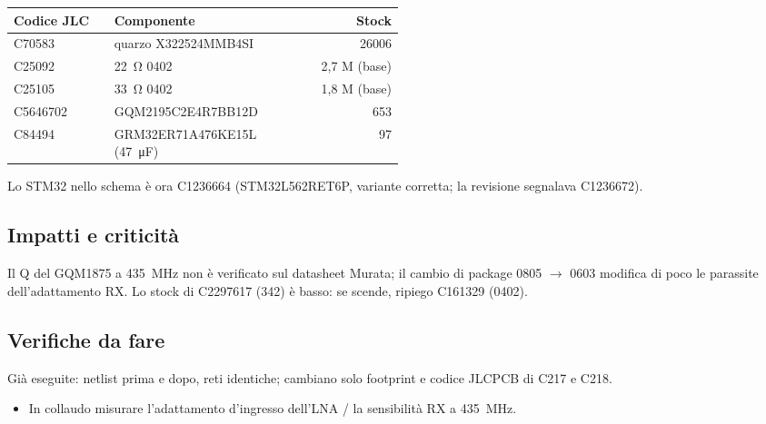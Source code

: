 {\small{}
\begin{tabular}{@{}lp{0.5\linewidth}r@{}}
\toprule
\textbf{Codice JLC} & \textbf{Componente} & \textbf{Stock}\\
\midrule
C70583 & quarzo X322524MMB4SI & 26006\\
C25092 & \SI{22}{\ohm} 0402 & 2,7 M (base)\\
C25105 & \SI{33}{\ohm} 0402 & 1,8 M (base)\\
C5646702 & GQM2195C2E4R7BB12D & 653\\
C84494 & GRM32ER71A476KE15L (\SI{47}{\micro\farad}) & 97\\
\bottomrule
\end{tabular}}

Lo STM32 nello schema è ora C1236664 (STM32L562RET6P, variante corretta; la revisione segnalava C1236672).

\subsection{Impatti e criticità}
\begin{notebox}
Il Q del GQM1875 a \SI{435}{\mega\hertz} non è verificato sul datasheet Murata; il cambio di package 0805 $\rightarrow$ 0603 modifica di poco le parassite dell'adattamento RX. Lo stock di C2297617 (342) è basso: se scende, ripiego C161329 (0402).
\end{notebox}

\subsection{Verifiche da fare}
Già eseguite: netlist prima e dopo, reti identiche; cambiano solo footprint e codice JLCPCB di C217 e C218.
\begin{itemize}
\item In collaudo misurare l'adattamento d'ingresso dell'LNA / la sensibilità RX a \SI{435}{\mega\hertz}.
\end{itemize}
